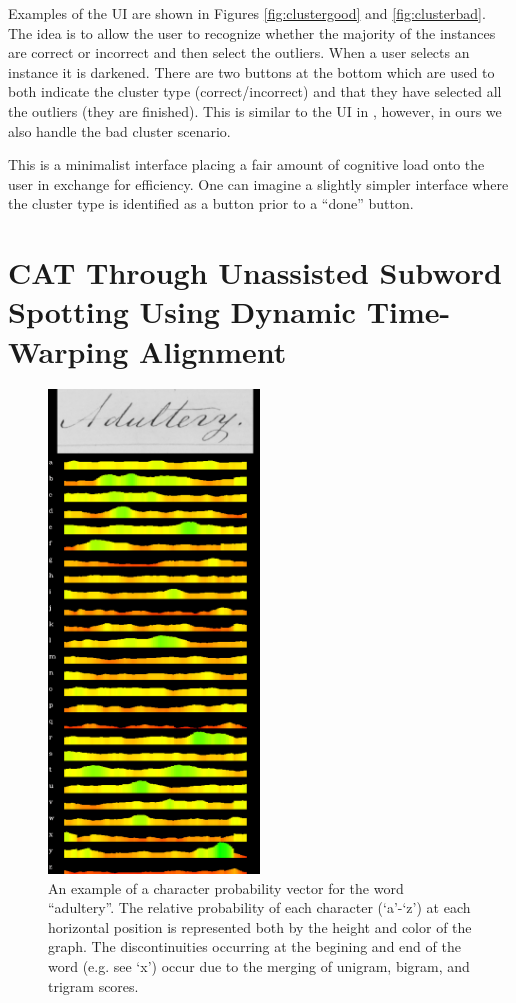 \documentclass[ms,electronic,twosidetoc,letterpaper,chaptercenter,parttop,lof,lot]{byumsphd}
\begin{document}
Examples of the UI are shown in Figures \ref{fig:clustergood} and \ref{fig:clusterbad}. The idea is to allow the user to recognize whether the majority of the instances are correct or incorrect and then select the outliers. When a user selects an instance it is darkened. There are two buttons at the bottom which are used to both indicate the cluster type (correct/incorrect) and that they have selected all the outliers (they are finished). This is similar to the UI in \cite{Clawson2014}, however, in ours we also handle the bad cluster scenario.

This is a minimalist interface placing a fair amount of cognitive load onto the user in exchange for efficiency. One can imagine a slightly simpler interface where the cluster type is identified as a button prior to a ``done'' button.



\section{CAT Through Unassisted Subword Spotting Using Dynamic Time-Warping Alignment} %

\begin{figure}
    \centering
    \includegraphics[width=0.5\textwidth]{cpv}
    \caption{An example of a character probability vector for the word ``adultery''. The relative probability of each character (`a'-`z') at each horizontal position is represented both by the height and color of the graph. The discontinuities occurring at the begining and end of the word (e.g. see `x') occur due to the merging of unigram, bigram, and trigram scores.}
    \label{fig:cpv}
\end{figure}
\end{document}
